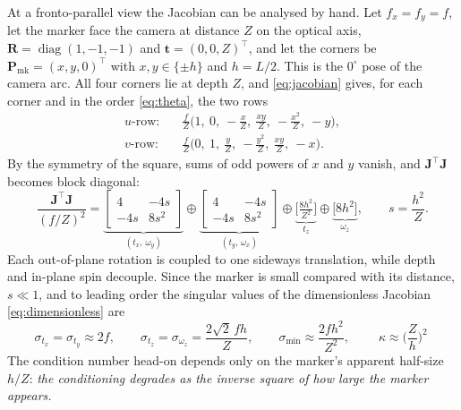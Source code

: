 \documentclass[11pt,a4paper]{article}
\theoremstyle{definition}
\theoremstyle{plain}
\theoremstyle{remark}
\newcommand{\Pmark}{\mathbf{P}_{\text{mk}}}
\begin{document}
At a fronto-parallel view the Jacobian can be analysed by hand. Let
$f_x = f_y = f$, let the marker face the camera at distance $Z$ on the optical
axis, $\mathbf{R} = \operatorname{diag}(1,-1,-1)$ and $\mathbf{t} =
(0,0,Z)^\top$, and let the corners be $\Pmark = (x,y,0)^\top$ with
$x,y\in\{\pm h\}$ and $h = L/2$. This is the $0^\circ$ pose of the camera arc.
All four corners lie at depth $Z$, and \eqref{eq:jacobian} gives, for each
corner and in the order \eqref{eq:theta}, the two rows
\begin{align}
  \text{$u$-row:}\quad
  &\frac{f}{Z}\Big(1,\ 0,\ -\frac{x}{Z},\ \frac{xy}{Z},\ -\frac{x^2}{Z},\ -y\Big),
  \nonumber\\
  \text{$v$-row:}\quad
  &\frac{f}{Z}\Big(0,\ 1,\ \frac{y}{Z},\ -\frac{y^2}{Z},\ \frac{xy}{Z},\ -x\Big).
  \label{eq:frontal-rows}
\end{align}
By the symmetry of the square, sums of odd powers of $x$ and $y$ vanish, and
$\mathbf{J}^\top\mathbf{J}$ becomes block diagonal:
\begin{equation}
  \frac{\mathbf{J}^\top\mathbf{J}}{(f/Z)^2}
  =
  \underbrace{\begin{bmatrix} 4 & -4s \\ -4s & 8s^2 \end{bmatrix}}_{(t_x,\,\omega_y)}
  \oplus
  \underbrace{\begin{bmatrix} 4 & -4s \\ -4s & 8s^2 \end{bmatrix}}_{(t_y,\,\omega_x)}
  \oplus
  \underbrace{\Big[\tfrac{8h^2}{Z^2}\Big]}_{t_z}
  \oplus
  \underbrace{\big[8h^2\big]}_{\omega_z},
  \qquad s = \frac{h^2}{Z}.
\end{equation}
Each out-of-plane rotation is coupled to one sideways translation, while depth
and in-plane spin decouple. Since the marker is small compared with its
distance, $s \ll 1$, and to leading order the singular values of the
dimensionless Jacobian \eqref{eq:dimensionless} are
\begin{equation}
  \sigma_{t_x} = \sigma_{t_y} \approx 2f,
  \qquad
  \sigma_{t_z} = \sigma_{\omega_z} = \frac{2\sqrt2\,fh}{Z},
  \qquad
  \sigma_{\min} \approx \frac{2fh^2}{Z^2},
  \qquad
  \boxed{\;\kappa \approx \Big(\frac{Z}{h}\Big)^2\;}
  \label{eq:frontal-sigmas}
\end{equation}
The condition number head-on depends only on the marker's apparent half-size
$h/Z$: \emph{the conditioning degrades as the inverse square of how large the
marker appears.}
\end{document}
